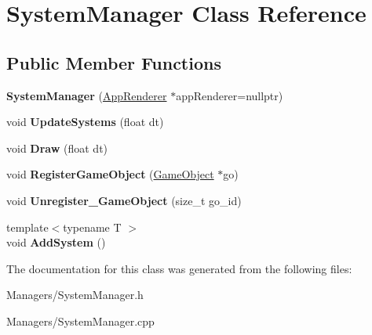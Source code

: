 \hypertarget{classSystemManager}{}\section{System\+Manager Class Reference}
\label{classSystemManager}
\subsection*{Public Member Functions}
\begin{DoxyCompactItemize}
\item 
\mbox{\label{classSystemManager_ae62443992cf22979a4a70ceb8c140951}} 
{\bfseries System\+Manager} (\hyperlink{classAppRenderer}{App\+Renderer} $\ast$app\+Renderer=nullptr)
\item 
\mbox{\label{classSystemManager_a077c85af7097d1420167ab3f10984a1c}} 
void {\bfseries Update\+Systems} (float dt)
\item 
\mbox{\label{classSystemManager_a1bab92d089c6c9546776fabf6e1e3098}} 
void {\bfseries Draw} (float dt)
\item 
\mbox{\label{classSystemManager_aaa98d81346a3d7ef4a8d8fb109525e4c}} 
void {\bfseries Register\+Game\+Object} (\hyperlink{classGameObject}{Game\+Object} $\ast$go)
\item 
\mbox{\label{classSystemManager_a2d1b76ca9585d167063f26220d9c2d7d}} 
void {\bfseries Unregister\+\_\+\+Game\+Object} (size\+\_\+t go\+\_\+id)
\item 
\mbox{\label{classSystemManager_a231ba9b19cf46c62334fd9442ca66602}} 
{\footnotesize template$<$typename T $>$ }\\void {\bfseries Add\+System} ()
\end{DoxyCompactItemize}


The documentation for this class was generated from the following files\+:\begin{DoxyCompactItemize}
\item 
Managers/System\+Manager.\+h\item 
Managers/System\+Manager.\+cpp\end{DoxyCompactItemize}
